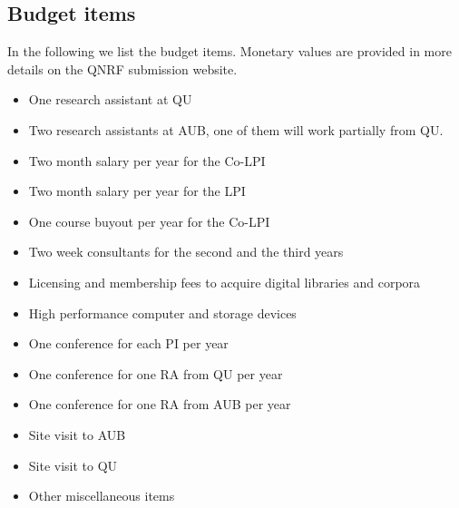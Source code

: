 \documentclass[12pt]{article}
\begin{document}


\subsection{Budget items}

In the following we list the budget items. 
Monetary values are provided in more details on the QNRF 
submission website. 

\begin{itemize}
\item One research assistant at QU
\item Two research assistants at AUB, one of them will 
work partially from QU. 
\item Two month salary per year for the Co-LPI
\item Two month salary per year for the LPI
\item One course buyout per year for the Co-LPI
\item Two week consultants for the second and the third years
\item Licensing and membership fees to acquire digital libraries and corpora
\item High performance computer and storage devices
\item One conference for each PI per year
\item One conference for one RA from QU per year
\item One conference for one RA from AUB per year
\item Site visit to AUB 
\item Site visit to QU 
\item Other miscellaneous items
\end{itemize}
\end{document}
